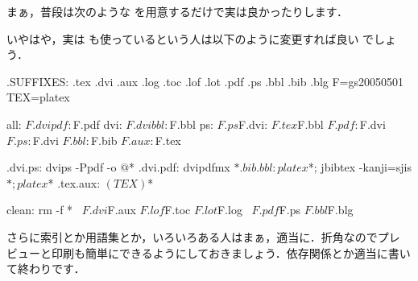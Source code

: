 まぁ，普段は次のような  を用意するだけで実は良かったりします．
いやはや，実は \JBibTeX も使っているという人は以下のように変更すれば良い
でしょう．%
\begin{Makefile}
.SUFFIXES: .tex .dvi .aux .log .toc .lof .lot .pdf .ps .bbl .bib .blg
F=gs20050501
TEX=platex

all:	$F.dvi
pdf:	$F.pdf
dvi:	$F.dvi
bbl:	$F.bbl
ps:	$F.ps

$F.dvi: $F.tex $F.bbl
$F.pdf: $F.dvi
$F.ps:	$F.dvi
$F.bbl: $F.bib
$F.aux: $F.tex

.dvi.ps:
	dvips -Ppdf -o $@ $*
.dvi.pdf:
	dvipdfmx $*
.bib.bbl:
	platex $*; jbibtex -kanji=sjis $*; platex $*
.tex.aux:
	$(TEX) $*

clean:
	rm -f *~ $F.dvi $F.aux $F.lof $F.toc $F.lot $F.log \
		$F.pdf $F.ps $F.bbl $F.blg
\end{Makefile}
さらに索引とか用語集とか，いろいろある人はまぁ，適当に．折角なのでプレ
ビューと印刷も簡単にできるようにしておきましょう．依存関係とか適当に書い
て終わりです．


